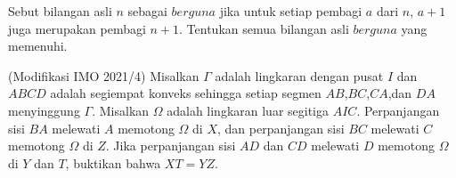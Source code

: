 \documentclass[12pt]{scrartcl}
\begin{document}
	\newpage
	\begin{soalbaru}
	Sebut bilangan asli $n$ sebagai $berguna$ jika untuk setiap pembagi $a$ dari $n$, $a+1$ juga merupakan pembagi $n+1$. Tentukan semua bilangan asli $berguna$ yang memenuhi.
	\end{soalbaru}
	
	\begin{soalbaru}
	(Modifikasi IMO 2021/4) Misalkan $\Gamma$ adalah lingkaran dengan pusat $I$ dan $ABCD$ adalah segiempat konveks sehingga setiap segmen $AB$,$BC$,$CA$,dan $DA$ menyinggung $\Gamma$. Misalkan $\Omega$ adalah lingkaran luar segitiga $AIC$. Perpanjangan sisi $BA$ melewati $A$ memotong $\Omega$ di $X$, dan perpanjangan sisi $BC$ melewati $C$ memotong $\Omega $ di $Z$. Jika perpanjangan sisi $AD$ dan $CD$ melewati $D$ memotong $\Omega$ di $Y$ dan $T$, buktikan bahwa $XT=YZ$.
	\end{soalbaru}
\end{document}
